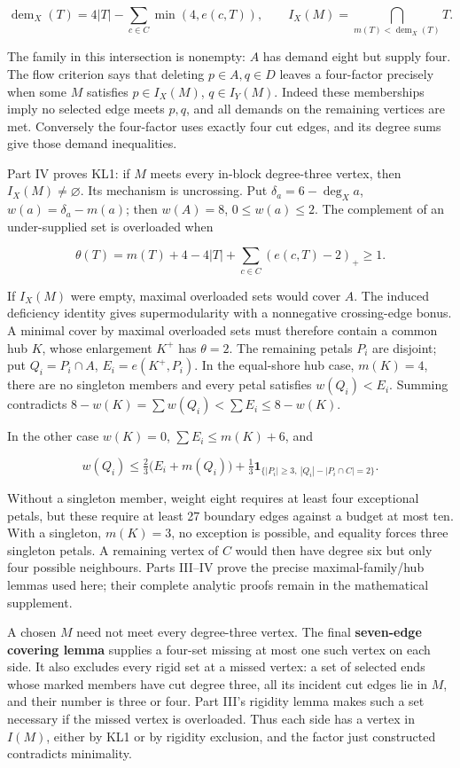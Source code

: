 \documentclass[smallextended]{svjour3}
\newcounter{none} %
\begin{document}
\[
\operatorname{dem}_X(T)=4|T|-\sum_{c\in C}\min(4,e(c,T)),\qquad
I_X(M)=\bigcap_{m(T)<\operatorname{dem}_X(T)}T.
\]

The family in this intersection is nonempty: \(A\) has demand eight but
supply four. The flow criterion says that deleting \(p\in A,q\in D\)
leaves a four-factor precisely when some \(M\) satisfies
\(p\in I_X(M)\), \(q\in I_Y(M)\). Indeed these memberships imply no
selected edge meets \(p,q\), and all demands on the remaining vertices
are met. Conversely the four-factor uses exactly four cut edges, and its
degree sums give those demand inequalities.

Part IV proves KL1: if \(M\) meets every in-block degree-three vertex,
then \(I_X(M)\ne\varnothing\). Its mechanism is uncrossing. Put
\(\delta_a=6-\deg_X a\), \(w(a)=\delta_a-m(a)\); then \(w(A)=8\),
\(0\le w(a)\le2\). The complement of an under-supplied set is overloaded
when

\[
\theta(T)=m(T)+4-4|T|+\sum_{c\in C}(e(c,T)-2)_+\ge1.
\]

If \(I_X(M)\) were empty, maximal overloaded sets would cover \(A\). The
induced deficiency identity gives supermodularity with a nonnegative
crossing-edge bonus. A minimal cover by maximal overloaded sets must
therefore contain a common hub \(K\), whose enlargement \(K^+\) has
\(\theta=2\). The remaining petals \(P_i\) are disjoint; put
\(Q_i=P_i\cap A\), \(E_i=e(K^+,P_i)\). In the equal-shore hub case,
\(m(K)=4\), there are no singleton members and every petal satisfies
\(w(Q_i)<E_i\). Summing contradicts
\(8-w(K)=\sum w(Q_i)<\sum E_i\le8-w(K)\).

In the other case \(w(K)=0\), \(\sum E_i\le m(K)+6\), and

\[
w(Q_i)\le\tfrac23\bigl(E_i+m(Q_i)\bigr)
+\tfrac13\mathbf1_{\{|P_i|\ge3,\ |Q_i|-|P_i\cap C|=2\}}.
\]

Without a singleton member, weight eight requires at least four
exceptional petals, but these require at least 27 boundary edges against
a budget at most ten. With a singleton, \(m(K)=3\), no exception is
possible, and equality forces three singleton petals. A remaining vertex
of \(C\) would then have degree six but only four possible neighbours.
Parts III--IV prove the precise maximal-family/hub lemmas used here;
their complete analytic proofs remain in the mathematical supplement.

A chosen \(M\) need not meet every degree-three vertex. The final
\textbf{seven-edge covering lemma} supplies a four-set missing at most
one such vertex on each side. It also excludes every rigid set at a
missed vertex: a set of selected ends whose marked members have cut
degree three, all its incident cut edges lie in \(M\), and their number
is three or four. Part III's rigidity lemma makes such a set necessary
if the missed vertex is overloaded. Thus each side has a vertex in
\(I(M)\), either by KL1 or by rigidity exclusion, and the factor just
constructed contradicts minimality.
\end{document}
